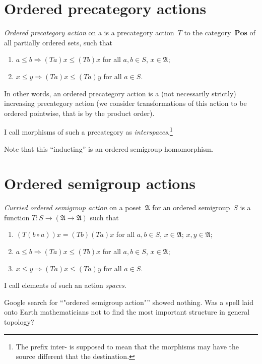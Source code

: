 \chapter{Ordered precategory actions}

\begin{defn}
\emph{Ordered precategory action} on a is a precategory action~$T$ to the category~$\mathbf{Pos}$ of all partially ordered sets, such that
\begin{enumerate}
\item $a\leq b\Rightarrow(Ta)x\leq (Tb)x$ for all $a,b\in S$, $x\in\mathfrak{A}$;
\item $x\leq y\Rightarrow(Ta)x\leq (Ta)y$ for all $a\in S$.
\end{enumerate}
In other words, an ordered precategory action is a (not necessarily strictly) increasing precategory action (we consider transformations of this action to be ordered pointwise, that is by the product order).

I call morphisms of such a precategory as \emph{interspaces}.\footnote{The prefix inter- is supposed to mean that the morphisms may have the source different that the destination.}
\end{defn}

Note that this ``inducting'' is an ordered semigroup homomorphism.

\chapter{Ordered semigroup actions}

\begin{defn}
\emph{Curried ordered semigroup action} on a poset~$\mathfrak{A}$ for an ordered semigroup~$S$ is a function $T:S\to(\mathfrak{A}\to\mathfrak{A})$ such that
\begin{enumerate}
\item $(T(b\circ a))x = (Tb)(Ta)x$ for all $a,b\in S$, $x\in\mathfrak{A}$;
$x,y\in\mathfrak{A}$;
\item $a\leq b\Rightarrow(Ta)x\leq (Tb)x$ for all $a,b\in S$, $x\in\mathfrak{A}$;
\item $x\leq y\Rightarrow(Ta)x\leq (Ta)y$ for all $a\in S$.
\end{enumerate}
I call elements of such an action \emph{spaces}.
\end{defn}

\begin{rem}
Google search for ``"ordered semigroup action"'' showed nothing. Was a spell laid onto Earth mathematicians not to find the most important structure in general topology?
\end{rem}

